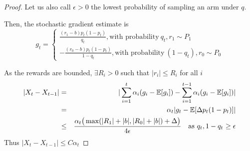 \begin{proof}
Let us also call $\epsilon>0$ the lowest probability of sampling an arm under $q$.

Then, the stochastic gradient estimate is 
    \[ g_t = \left\{
                \begin{array}{l}
                  \frac{(r_1 -b) p_t (1-p_t)}{q_t}, \text{with probability}\ q_t, r_1 \sim P_1 \\
                  - \frac{(r_0 - b) p_t (1-p_t)}{1-q_t}, \text{with probability}\ (1-q_t), r_0 \sim P_0
                \end{array}
              \right.
    \]
        
        As the rewards are bounded, $\exists R_i >0$ such that $|r_i| \le R_i$ for all $i$
        \begin{eqnarray*}
        |X_t - X_{t-1}| &=&|\sum_{i=1}^t \alpha_i (g_i-\mathbb{E}[g_i])- \sum_{i=1}^{t-1} \alpha_i (g_i-\mathbb{E}[g_i])| \\
        &=& \alpha_t |g_t - \mathbb{E}[\Delta p_t(1-p_t)]|\\
        &\le& \frac{\alpha_t  \big(\max(|R_1|+|b|, |R_0|+|b|) + \Delta \big)}{4\epsilon} \quad \text{as $q_t, 1-q_t$ $\ge \epsilon$}
        \end{eqnarray*}
        Thus   $|X_t - X_{t-1}| \le C \alpha_t$

\end{proof}

